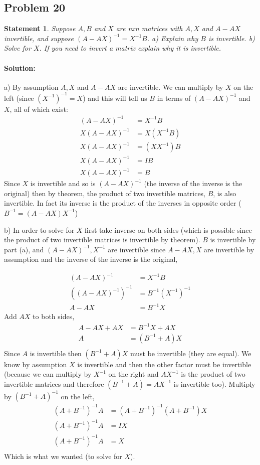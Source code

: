 \documentclass[12pt, letterpaper]{article}
\theoremstyle{statement}
\theoremstyle{statement}
\newtheorem*{atmStat}{Statement}
\newenvironment{Solution}{\noindent\ignorespaces\paragraph{Solution:}}{\hfill \ding{122}\par\noindent}
\begin{document}
    \subsection*{Problem 20}
    \begin{atmStat}
    Suppose $A, B$ and $X$ are nxn matrices with $A, X$ and $A - AX$ invertible, and suppose $(A-AX)^{-1}=X^{-1}B$. a) Explain why $B$ is invertible. b) Solve for $X$. If you need to invert a matrix explain why it is invertible.
    \end{atmStat}
    \begin{Solution}
    a) By assumption $A, X$ and $A - AX$ are invertible. We can multiply by $X$ on the left (since $(X^{-1})^{-1}=X$) and this will tell us $B$ in terms of $(A-AX)^{-1}$ and $X$, all of which exist: 
    \begin{align*}
        (A-AX)^{-1}&=X^{-1}B\\
        X(A-AX)^{-1}&=X(X^{-1}B)\\
        X(A-AX)^{-1}&=(XX^{-1})B\\
        X(A-AX)^{-1}&=IB\\
        X(A-AX)^{-1}&=B
    \end{align*}
    Since $X$ is invertible and so is $(A-AX)^{-1}$ (the inverse of the inverse is the original) then by theorem, the product of two invertible matrices, $B$, is also invertible. In fact its inverse is the product of the inverses in opposite order ($B^{-1}=(A-AX)X^{-1}$)
    
    b) In order to solve for $X$ first take inverse on both sides (which is possible since the product of two invertible matrices is invertible by theorem). $B$ is invertible by part (a), and $(A-AX)^{-1}, X^{-1}$ are invertible since $A-AX, X$ are invertible by assumption and the inverse of the inverse is the original,
    
    \begin{align*}
        (A-AX)^{-1}&=X^{-1}B \\
        ((A-AX)^{-1})^{-1} &= B^{-1}(X^{-1})^{-1} \\
        A-AX &= B^{-1}X
    \end{align*}
    Add $AX$ to both sides,
    \begin{align*}
        A-AX+AX&=B^{-1}X+AX \\
        A &= (B^{-1}+A)X \\
    \end{align*}
    Since $A$ is invertible then $(B^{-1}+A)X$ must be invertible (they are equal). We know by assumption $X$ is invertible and then the other factor must be invertible (because we can multiply by $X^{-1}$ on the right and $AX^{-1}$ is the product of two invertible matrices and therefore $(B^{-1}+A)=AX^{-1}$ is invertible too). Multiply by $(B^{-1}+A)^{-1}$ on the left,
    \begin{align*}
        (A+B^{-1})^{-1}A&=(A+B^{-1})^{-1}(A+B^{-1})X \\
        (A+B^{-1})^{-1}A &= IX \\
        (A+B^{-1})^{-1}A &= X \\
    \end{align*}
    Which is what we wanted (to solve for $X$).
    \end{Solution}
    
\end{document}
